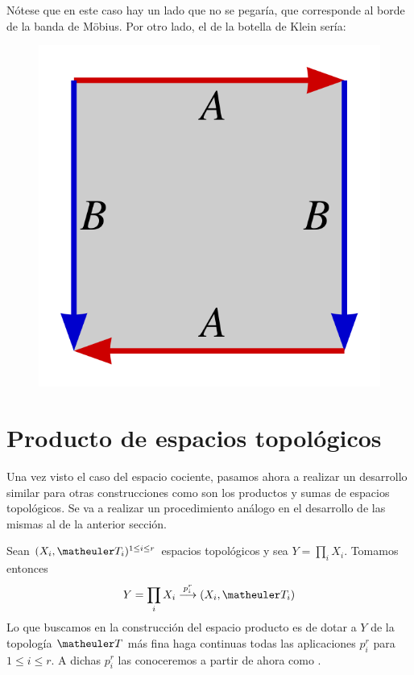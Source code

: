 \begin{exa}
\begin{enumerate}
		Nótese que en este caso hay un lado que no se pegaría, que corresponde al borde de la banda de Möbius. 
		\newpage
		Por otro lado, el de la botella de Klein sería:
		\begin{figure}[h!]
			\centering
			\includegraphics[scale = 0.1]{img/pol_fund_botella_klein}
		\end{figure}
	\end{enumerate}
\end{exa}

\section{Producto de espacios topológicos}
Una vez visto el caso del espacio cociente, pasamos ahora a realizar un desarrollo similar para otras construcciones como son los productos y sumas de espacios topológicos. Se va a realizar un procedimiento análogo en el desarrollo de las mismas al de la anterior sección.

Sean $(X_{i },\T_{i})^{1\le i\le r}$ espacios topológicos y sea $Y=\prod_i X_i$. Tomamos entonces 
\begin{equation}
Y=\prod_i X_i \stackrel{p_i^r}{\longrightarrow}(X_i,\T_i)
\end{equation}
Lo que buscamos en la construcción del espacio producto es de dotar a $Y$ de la topología $\T$ más fina haga continuas todas las aplicaciones $p_i^r$ para $1\le i\le r$. A dichas  $p_i^r$ las conoceremos a partir de ahora como .

